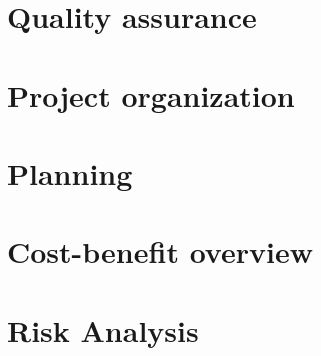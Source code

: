 \documentclass[11pt, a4paper]{report}
\begin{document}
\begin{justify}
\chapter{Quality assurance}
	

\chapter{Project organization}
	

\chapter{Planning}
	

\chapter{Cost-benefit overview}
	

\chapter{Risk Analysis}
	

	\end{justify}
\end{document}

